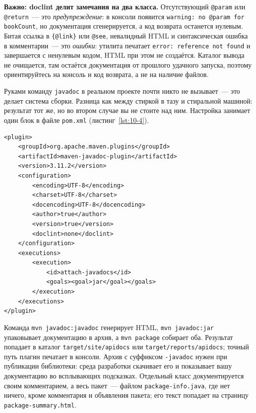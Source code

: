 \begin{vrezka}
\textbf{Важно: doclint делит замечания на два класса.} Отсутствующий \texttt{@param} или \texttt{@return}~--- это \emph{предупреждение}: в консоли появится \texttt{warning: no @param for bookCount}, но документация сгенерируется, а код возврата останется нулевым. Битая ссылка в \texttt{\{@link\}} или \texttt{@see}, невалидный HTML и синтаксическая ошибка в комментарии~--- это \emph{ошибки}: утилита печатает \texttt{error: reference not found} и завершается с ненулевым кодом, HTML при этом не создаётся. Каталог вывода не очищается, там остаётся документация от прошлого удачного запуска, поэтому ориентируйтесь на консоль и код возврата, а не на наличие файлов.
\end{vrezka}

Руками команду \texttt{javadoc} в реальном проекте почти никто не вызывает~--- это делает система сборки. Разница как между стиркой в тазу и стиральной машиной: результат тот же, но во втором случае вы не стоите над ним. Настройка занимает один блок в файле \texttt{pom.xml} (листинг~\ref{lst:10-4}).

\begin{listing}[H]
\begin{verbatim}
<plugin>
    <groupId>org.apache.maven.plugins</groupId>
    <artifactId>maven-javadoc-plugin</artifactId>
    <version>3.11.2</version>
    <configuration>
        <encoding>UTF-8</encoding>
        <charset>UTF-8</charset>
        <docencoding>UTF-8</docencoding>
        <author>true</author>
        <version>true</version>
        <doclint>none</doclint>
    </configuration>
    <executions>
        <execution>
            <id>attach-javadocs</id>
            <goals><goal>jar</goal></goals>
        </execution>
    </executions>
</plugin>
\end{verbatim}
\caption{Подключение maven-javadoc-plugin}
\label{lst:10-4}
\end{listing}

Команда \texttt{mvn javadoc:javadoc} генерирует HTML, \texttt{mvn javadoc:jar} упаковывает документацию в архив, а \texttt{mvn package} собирает оба. Результат попадает в каталог \texttt{target/site/apidocs} или \texttt{target/reports/apidocs}; точный путь плагин печатает в консоли. Архив с суффиксом \texttt{-javadoc} нужен при публикации библиотеки: среда разработки скачивает его и показывает вашу документацию во всплывающих подсказках. Отдельный класс документируется своим комментарием, а весь пакет~--- файлом \texttt{package-info.java}, где нет ничего, кроме комментария и объявления пакета; его текст попадает на страницу \texttt{package-summary.html}.

